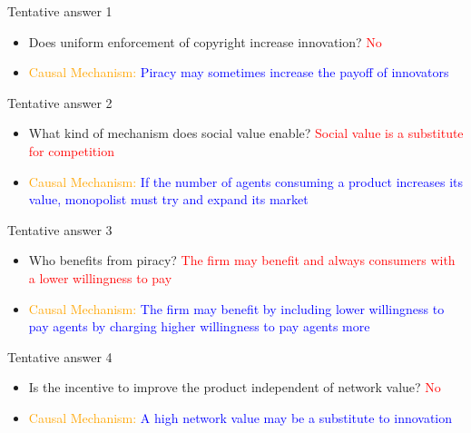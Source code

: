 \documentclass{beamer}
\numberwithin{equation}{section}
\begin{document}
\begin{frame}{Tentative answer 1}
\begin{itemize}
    \item Does uniform enforcement of copyright increase innovation? \textcolor{red}{No}
    \item \textcolor{orange}{Causal Mechanism:} \textcolor{blue}{Piracy may sometimes increase the payoff of innovators}
\end{itemize}
\end{frame}
\begin{frame}{Tentative answer 2}
\begin{itemize}
    \item What kind of mechanism does social value enable? \textcolor{red}{Social value is a substitute for competition}
    \item \textcolor{orange}{Causal Mechanism:} \textcolor{blue}{If the number of agents consuming a product increases its value, monopolist must try and expand its market}
\end{itemize}
\end{frame}
\begin{frame}{Tentative answer 3}
\begin{itemize}
    \item Who benefits from piracy?  \textcolor{red}{The firm may benefit and always consumers with a lower willingness to pay}
    \item \textcolor{orange}{Causal Mechanism:} \textcolor{blue}{The firm may benefit by including lower willingness to pay agents by charging higher willingness to pay agents more}
\end{itemize}
\end{frame}
\begin{frame}{Tentative answer 4}
\begin{itemize}
    \item Is the incentive to improve the product independent of network value? \textcolor{red}{No}
    \item \textcolor{orange}{Causal Mechanism:} \textcolor{blue}{A high network value may be a substitute to innovation}
\end{itemize}
\end{frame}
\end{document}
